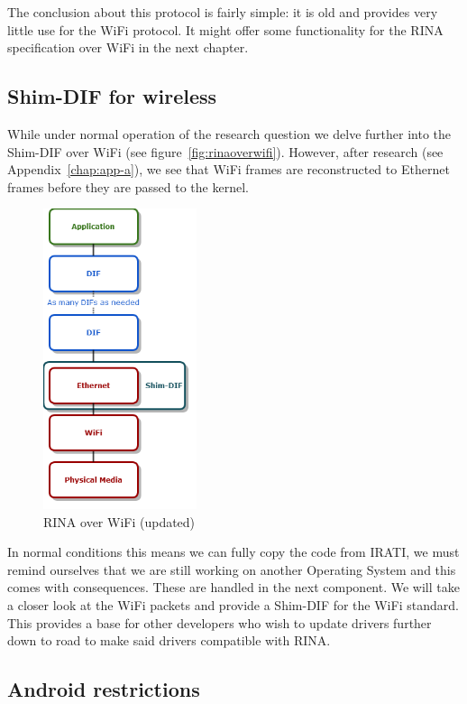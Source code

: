 The conclusion about this protocol is fairly simple: it is old and provides very little use for the WiFi protocol. It might offer some functionality for the RINA specification over WiFi in the next chapter. 

\subsection{Shim-DIF for wireless}

While under normal operation of the research question we delve further into the Shim-DIF over WiFi (see figure~\ref{fig:rinaoverwifi}). However, after research (see Appendix~\ref{chap:app-a}), we see that WiFi frames are reconstructed to Ethernet frames before they are passed to the kernel. 

\begin{figure}[H]
    \centering
    \includegraphics[width=0.4\textwidth]{figures/rinaoverwifi2}
    \caption{RINA over WiFi (updated)} 
    \label{fig:rinaoverwifi2}
\end{figure}

\npar
In normal conditions this means we can fully copy the code from IRATI, we must remind ourselves that we are still working on another Operating System and this comes with consequences. These are handled in the next component. We will take a closer look at the WiFi packets and provide a Shim-DIF for the WiFi standard. This provides a base for other developers who wish to update drivers further down to road to make said drivers compatible with RINA. 

\subsection{Android restrictions}
\label{ssec:android-restrictions}

